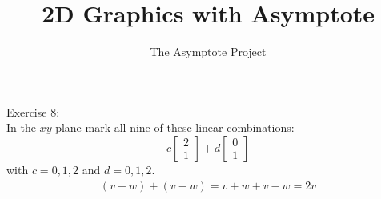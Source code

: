 \documentclass[12pt]{article}
\title{2D Graphics with Asymptote}
\author{The Asymptote Project}
\newcommand{\insertrep}[1]{%
	\hspace*{-2.4cm}
	\fbox{\texttt{[image: \#1]}}
}
\begin{document}
	Exercise 8:\\
	In the $xy$ plane mark all nine of these linear combinations:
	$$c\begin{bmatrix}2\\1\end{bmatrix}+d\begin{bmatrix}0\\1\end{bmatrix}$$
	with $c=0,1,2$ and $d=0,1,2$.
	\begin{align*}
	(v+w)+(v-w) = v+w+v-w = 2v
	\end{align*}
	\begin{center}
		\insertrep{exercise01008.pdf}
	\end{center}
\end{document}
